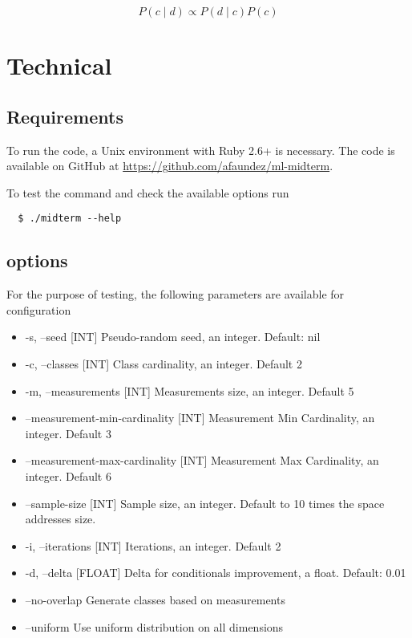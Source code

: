 \documentclass[letterpaper, conference]{IEEEtran}
\begin{document}
\begin{equation} \label{eq:bayes-theorem-proportional}
P(c \mid d) \mathbin{\propto} P(d \mid c)\mathbin{}P(c)
\end{equation}

\section{Technical}

\subsection{Requirements}

To run the code, a Unix environment with Ruby 2.6+ is necessary. The code is available on GitHub at \url{https://github.com/afaundez/ml-midterm}.

To test the command and check the available options run

\begin{verbatim}
  $ ./midterm --help
\end{verbatim}

\subsection{options}

For the purpose of testing, the following parameters are available for configuration

\begin{itemize}
    \item-s, --seed [INT]                 Pseudo-random seed, an integer. Default: nil
    \item-c, --classes [INT]              Class cardinality, an integer. Default 2
    \item-m, --measurements [INT]         Measurements size, an integer. Default 5
    \item    --measurement-min-cardinality [INT]
                                     Measurement Min Cardinality, an integer. Default 3
    \item    --measurement-max-cardinality [INT]
                                     Measurement Max Cardinality, an integer. Default 6
    \item    --sample-size [INT]          Sample size, an integer. Default to 10 times the  space addresses size.
    \item-i, --iterations [INT]           Iterations, an integer. Default 2
    \item-d, --delta [FLOAT]              Delta for conditionals improvement, a float. Default: 0.01
    \item    --no-overlap                 Generate classes based on measurements
    \item    --uniform                    Use uniform distribution on all dimensions
\end{itemize}
\end{document}
